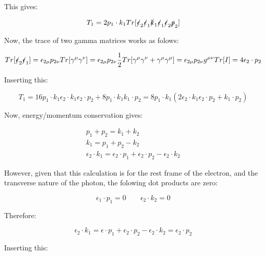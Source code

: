 \documentclass[a4]{article}
\begin{document}
    This gives:

    \begin{equation}
        T_1 = 2 p_1 \cdot k_1 Tr[\slashed{\epsilon}_2 \slashed{\epsilon}_1 \slashed{k}_1 \slashed{\epsilon}_1 \slashed{\epsilon}_2 \slashed{p}_2]
    \end{equation}

    Now, the trace of two gamma matrices works as folows:

    \begin{equation}
        Tr [\slashed{\epsilon}_2 \slashed{\epsilon}_1] = \epsilon_{2 \mu} p_{2 \nu} Tr [\gamma^\mu \gamma^\nu] = \epsilon_{2 \mu} p_{2 \nu} \frac{1}{2} Tr [\gamma^\mu \gamma^\nu + \gamma^\mu \gamma^\mu] = \epsilon_{2 \mu} p_{2 \nu} g^{\mu \nu} Tr[I] = 4 \epsilon_2 \cdot p_2
    \end{equation}

    Inserting this:

    \begin{equation}
        T_1 = 16 p_1 \cdot k_1 \epsilon_2 \cdot k_1 \epsilon_2 \cdot p_2 + 8 p_1 \cdot k_1 k_1 \cdot p_2 = 8 p_1 \cdot k_1 (2 \epsilon_2 \cdot k_1 \epsilon_2 \cdot p_2 + k_1 \cdot p_2)
    \end{equation}

    Now, energy/momentum conservation gives:

    \begin{eqnarray}
        p_1 + p_2 = k_1 + k_2 \\
        k_1 = p_1 + p_2 - k_2 \\
        \epsilon_2 \cdot k_1 = \epsilon_2 \cdot p_1 + \epsilon_2 \cdot p_2 - \epsilon_2 \cdot k_2
    \end{eqnarray}

    However, given that this calculation is for the rest frame of the electron, and the transverse nature of the photon, the folowing dot products are zero:

    \begin{equation}
        \epsilon_1 \cdot p_1 = 0 \qquad \epsilon_2 \cdot k_2 = 0
    \end{equation}

    Therefore:

    \begin{equation}
        \epsilon_2 \cdot k_1 = \epsilon \cdot p_1 + \epsilon_2 \cdot p_2 - \epsilon_2 \cdot k_2 = \epsilon_2 \cdot p_2
    \end{equation}

    Inserting this:
\end{document}
